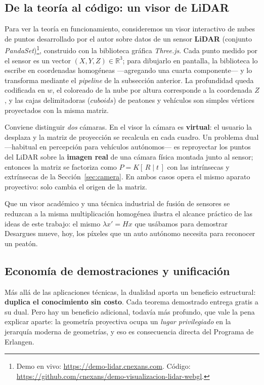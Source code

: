 \documentclass[11pt,a4paper]{article}
\newcommand{\R}{\mathbb{R}}
\begin{document}
\subsection{De la teoría al código: un visor de LiDAR}

Para ver la teoría en funcionamiento, consideremos un visor interactivo de
nubes de puntos desarrollado por el autor sobre datos de un sensor
\textbf{LiDAR} (conjunto \emph{PandaSet})\footnote{Demo en vivo:
\url{https://demo-lidar.cnexans.com}. Código:
\url{https://github.com/cnexans/demo-visualizacion-lidar-webgl}.}, construido
con la biblioteca gráfica \emph{Three.js}. Cada punto medido por el
sensor es un vector $(X,Y,Z)\in\R^3$; para dibujarlo en pantalla, la
biblioteca lo escribe en coordenadas homogéneas —agregando una cuarta
componente— y lo transforma mediante el \emph{pipeline} de la subsección
anterior. La profundidad queda codificada en $w$, el coloreado de la nube
por altura corresponde a la coordenada $Z$, y las cajas delimitadoras
($cuboids$) de peatones y vehículos son simples vértices proyectados
con la misma matriz.

Conviene distinguir \emph{dos} cámaras. En el visor la cámara es
\textbf{virtual}: el usuario la desplaza y la matriz de proyección se
recalcula en cada cuadro. Un problema dual —habitual en percepción para
vehículos autónomos— es reproyectar los puntos del LiDAR sobre la
\textbf{imagen real} de una cámara física montada junto al sensor;
entonces la matriz se factoriza como $P=K[\,R\mid t\,]$ con las
intrínsecas y extrínsecas de la Sección~\ref{sec:camera}. En ambos casos
opera el mismo aparato proyectivo: solo cambia el origen de la matriz.

Que un visor académico y una técnica industrial de fusión de sensores se
reduzcan a la misma multiplicación homogénea ilustra el alcance práctico
de las ideas de este trabajo: el mismo $\lambda x' = Hx$ que usábamos para
demostrar Desargues mueve, hoy, los píxeles que un auto autónomo necesita
para reconocer un peatón.

\subsection{Economía de demostraciones y unificación}

Más allá de las aplicaciones técnicas, la dualidad aporta un beneficio
estructural: \textbf{duplica el conocimiento sin costo}. Cada teorema
demostrado entrega gratis a su dual. Pero hay un beneficio adicional,
todavía más profundo, que vale la pena explicar aparte: la geometría
proyectiva ocupa un \emph{lugar privilegiado} en la jerarquía moderna de
geometrías, y eso es consecuencia directa del Programa de Erlangen.
\end{document}
